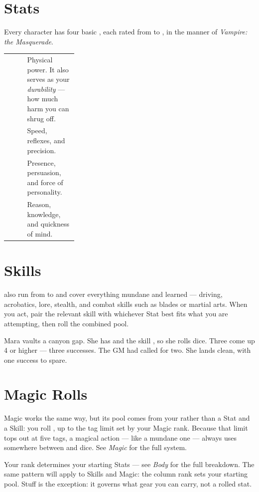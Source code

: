 \section{Stats}
Every character has four basic , each rated from  to
, in the manner of \emph{Vampire: the Masquerade}.

\begin{statblock}
\begin{tabularx}{\linewidth}{@{}p{0.28\linewidth} Y@{}}
 & Physical power. It also serves as your \emph{durability} --- how much harm you can shrug off.\\[3pt]
 & Speed, reflexes, and precision.\\[3pt]
 & Presence, persuasion, and force of personality.\\[3pt]
 & Reason, knowledge, and quickness of mind.\\
\end{tabularx}
\end{statblock}

\section{Skills}
 also run from  to  and cover everything
mundane and learned --- driving, acrobatics, lore, stealth, and combat
skills such as blades or martial arts. When you act, pair the relevant
skill with whichever Stat best fits what you are attempting, then roll the
combined pool.

\begin{example}
Mara vaults a canyon gap. She has   and the
 skill , so she rolls  dice. Three come
up 4 or higher --- three successes. The GM had called for two. She lands
clean, with one success to spare.
\end{example}

\section{Magic Rolls}
Magic works the same way, but its pool comes from your 
rather than a Stat and a Skill: you roll , up to the tag limit set by your Magic rank. Because that
limit tops out at five tags, a magical action --- like a mundane one ---
always uses somewhere between  and  dice. See
\emph{Magic} for the full system.

\begin{notebox}
Your  rank determines your starting Stats --- see \emph{Body}
for the full breakdown. The same pattern will apply to Skills and Magic: the
column rank sets your starting pool. Stuff is the exception: it governs what
gear you can carry, not a rolled stat.
\end{notebox}
